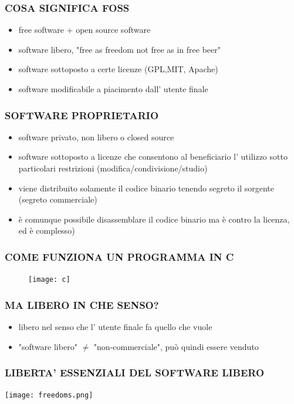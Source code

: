 \documentclass{beamer}
\begin{document}
\begin{frame}
    \frametitle{COSA SIGNIFICA FOSS}
        \begin{itemize}
            \item free software + open source software 
            \item software libero, "free as freedom not free as in free beer"
            \item software sottoposto a certe licenze (GPL,MIT, Apache)
            \item software modificabile a piacimento dall' utente finale
        \end{itemize}
\end{frame}


\begin{frame}
    \frametitle{SOFTWARE PROPRIETARIO}
        \begin{itemize}
            \item software privato, non libero o closed source
            \item software sottoposto a licenze che consentono al beneficiario l' utilizzo sotto particolari restrizioni (modifica/condivisione/studio)
            \item viene distribuito solamente il codice binario tenendo segreto il sorgente (segreto commerciale)
            \item è comunque possibile disassemblare il codice binario ma è contro la licenza, ed è complesso)
        \end{itemize}
\end{frame}

\begin{frame}
    \frametitle{COME FUNZIONA UN PROGRAMMA IN C}
        \begin{figure}
            \texttt{[image: c]}
        \end{figure}
\end{frame}

\begin{frame}
    \frametitle{MA LIBERO IN CHE SENSO?}
        \begin{itemize}
            \item libero nel senso che l' utente finale fa quello che vuole
            \item "software libero" $\neq$ "non-commerciale", può quindi essere venduto
        \end{itemize}
\end{frame}


\begin{frame}
    \frametitle{LIBERTA' ESSENZIALI DEL SOFTWARE LIBERO}
        \begin{center}
            \texttt{[image: freedoms.png]}
        \end{center}
\end{frame}
\end{document}

